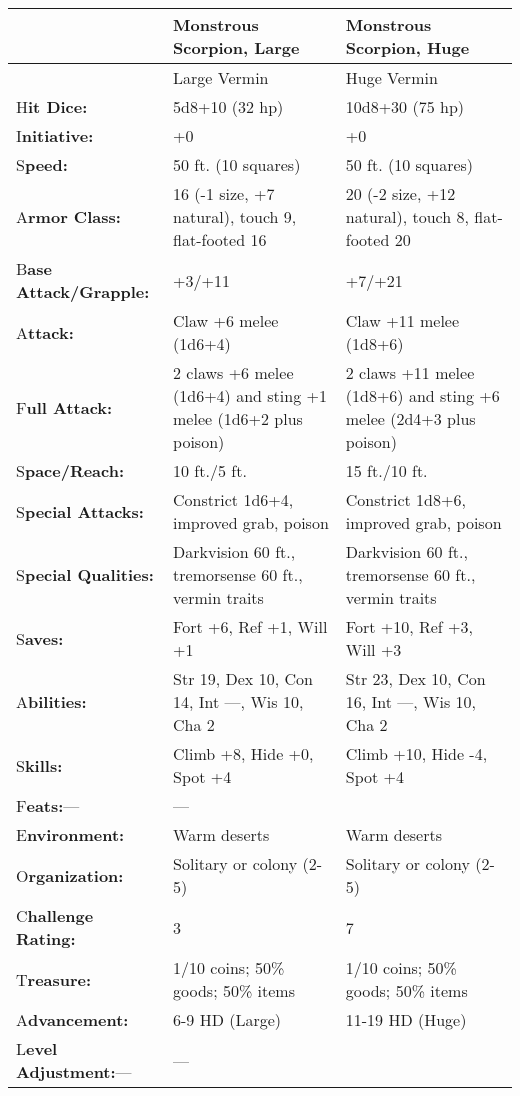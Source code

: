 \documentclass{article}
\begin{document}
\vspace{12pt}
\begin{tabular}{|>{\raggedright}p{57pt}|>{\raggedright}p{127pt}|>{\raggedright}p{129pt}|}
\hline
  & M\textbf{onstrous Scorpion, Large} & M\textbf{onstrous Scorpion, Huge}\tabularnewline
\hline
  & Large Vermin & Huge Vermin\tabularnewline
\hline
H\textbf{it Dice:} & 5d8+10 (32 hp) & 10d8+30 (75 hp)\tabularnewline
\hline
I\textbf{nitiative:} & +0 & +0\tabularnewline
\hline
S\textbf{peed:} & 50 ft. (10 squares) & 50 ft. (10 squares)\tabularnewline
\hline
A\textbf{rmor Class:} & 16 (-1 size, +7 natural), touch 9, flat-footed 16 & 20 
(-2 size, +12 natural), touch 8, flat-footed 20\tabularnewline
\hline
B\textbf{ase Attack/Grapple:} & +3/+11 & +7/+21\tabularnewline
\hline
A\textbf{ttack:} & Claw +6 melee (1d6+4) & Claw +11 melee (1d8+6)\tabularnewline
\hline
F\textbf{ull Attack:} & 2 claws +6 melee (1d6+4) and sting +1 melee (1d6+2 plus 
poison) & 2 claws +11 melee (1d8+6) and sting +6 melee (2d4+3 plus poison)\tabularnewline
\hline
S\textbf{pace/Reach:} & 10 ft./5 ft. & 15 ft./10 ft.\tabularnewline
\hline
S\textbf{pecial Attacks:} & Constrict 1d6+4, improved grab, poison & Constrict 
1d8+6, improved grab, poison\tabularnewline
\hline
S\textbf{pecial Qualities:} & Darkvision 60 ft., tremorsense 60 ft., vermin traits & Darkvision 
60 ft., tremorsense 60 ft., vermin traits\tabularnewline
\hline
S\textbf{aves:} & Fort +6, Ref +1, Will +1 & Fort +10, Ref +3, Will +3\tabularnewline
\hline
A\textbf{bilities:} & Str 19, Dex 10, Con 14, Int ---, Wis 10, Cha 2 & Str 23, 
Dex 10, Con 16, Int ---, Wis 10, Cha 2\tabularnewline
\hline
S\textbf{kills:} & Climb +8, Hide +0, Spot +4 & Climb +10, Hide -4, Spot +4\tabularnewline
\hline
F\textbf{eats:}--- & --- & \tabularnewline
\hline
E\textbf{nvironment:} & Warm deserts & Warm deserts\tabularnewline
\hline
O\textbf{rganization:} & Solitary or colony (2-5) & Solitary or colony (2-5)\tabularnewline
\hline
C\textbf{hallenge Rating:} & 3 & 7\tabularnewline
\hline
T\textbf{reasure:} & 1/10 coins; 50\% goods; 50\% items & 1/10 coins; 50\% goods; 
50\% items\tabularnewline
\hline
A\textbf{dvancement:} & 6-9 HD (Large) & 11-19 HD (Huge)\tabularnewline
\hline
L\textbf{evel Adjustment:}--- & --- & \tabularnewline
\hline
\end{tabular}
\end{document}

